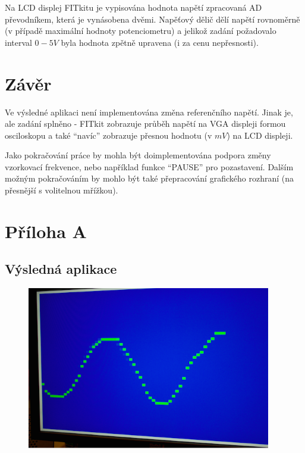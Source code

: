 \documentclass[a4paper, 11pt, titlepage]{article}
\begin{document}
	Na LCD displej FITkitu je vypisována hodnota napětí zpracovaná AD převodníkem,
	která je vynásobena dvěmi. Napěťový dělič dělí napětí rovnoměrně (v případě maximální
	hodnoty potenciometru) a jelikož zadání požadovalo interval $0-5V$ byla hodnota zpětně upravena (i za cenu nepřesnosti). 

\section{Závěr} %
\label{sec:zaver}
	Ve výsledné aplikaci není implementována změna referenčního napětí. Jinak je, ale 
	zadání splněno - FITkit zobrazuje průběh napětí na VGA displeji formou osciloskopu
	a také ``navíc'' zobrazuje přesnou hodnotu (v $mV$) na LCD displeji. 

	Jako pokračování práce by mohla být doimplementována podpora změny vzorkovací
	frekvence, nebo například funkce ``PAUSE'' pro pozastavení. Dalším možným 
	pokračováním by mohlo být také přepracování grafického rozhraní (na přesnější 
	s volitelnou mřížkou).  

\newpage


\renewcommand{\refname}{Literatura}


\pagestyle{empty}

\section*{Příloha A} %
\label{sec:prilohy}


\subsection{Výsledná aplikace} %
\label{sub:vysledna_aplikace}

\begin{figure}[htbp]
	\centering
	\includegraphics[width=0.95\textwidth]{img/b.png}
\end{figure}
\end{document}
